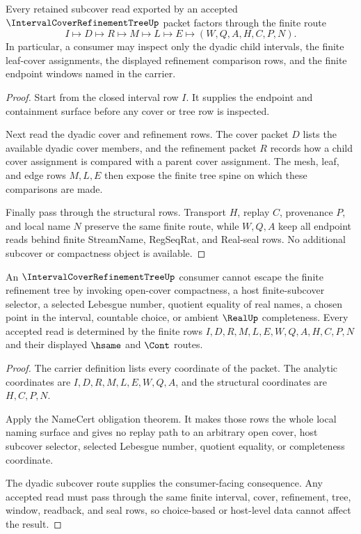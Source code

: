 \begin{theorem}
\label{thm:interval-cover-refinement-tree-dyadic-subcover-route}
Every retained subcover read exported by an accepted $\IntervalCoverRefinementTreeUp$ packet factors through the finite route
$$
I\longmapsto D\longmapsto R\longmapsto M\longmapsto L\longmapsto E\longmapsto(W,Q,A,H,C,P,N).
$$
In particular, a consumer may inspect only the dyadic child intervals, the finite leaf-cover assignments, the displayed refinement comparison rows, and the finite endpoint windows named in the carrier.
\end{theorem}
\begin{proof}
Start from the closed interval row $I$. It supplies the endpoint and containment surface before any cover or tree row is inspected.

Next read the dyadic cover and refinement rows. The cover packet $D$ lists the available dyadic cover members, and the refinement packet $R$ records how a child cover assignment is compared with a parent cover assignment. The mesh, leaf, and edge rows $M,L,E$ then expose the finite tree spine on which these comparisons are made.

Finally pass through the structural rows. Transport $H$, replay $C$, provenance $P$, and local name $N$ preserve the same finite route, while $W,Q,A$ keep all endpoint reads behind finite StreamName, RegSeqRat, and Real-seal rows. No additional subcover or compactness object is available.
\end{proof}

\begin{theorem}
\label{thm:interval-cover-refinement-tree-choice-free-nonescape}
An $\IntervalCoverRefinementTreeUp$ consumer cannot escape the finite refinement tree by invoking open-cover compactness, a host finite-subcover selector, a selected Lebesgue number, quotient equality of real names, a chosen point in the interval, countable choice, or ambient $\RealUp$ completeness. Every accepted read is determined by the finite rows $I,D,R,M,L,E,W,Q,A,H,C,P,N$ and their displayed $\hsame$ and $\Cont$ routes.
\end{theorem}
\begin{proof}
The carrier definition lists every coordinate of the packet. The analytic coordinates are $I,D,R,M,L,E,W,Q,A$, and the structural coordinates are $H,C,P,N$.

Apply the NameCert obligation theorem. It makes those rows the whole local naming surface and gives no replay path to an arbitrary open cover, host subcover selector, selected Lebesgue number, quotient equality, or completeness coordinate.

The dyadic subcover route supplies the consumer-facing consequence. Any accepted read must pass through the same finite interval, cover, refinement, tree, window, readback, and seal rows, so choice-based or host-level data cannot affect the result.
\end{proof}

